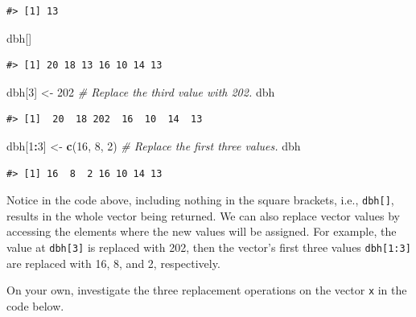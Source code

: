 \documentclass[
  11pt,
]{krantz}
\newenvironment{Shaded}{\begin{snugshade}}{\end{snugshade}}
\newcommand{\CommentTok}[1]{\textcolor[rgb]{0.56,0.35,0.01}{\textit{#1}}}
\newcommand{\DecValTok}[1]{\textcolor[rgb]{0.00,0.00,0.81}{#1}}
\newcommand{\KeywordTok}[1]{\textcolor[rgb]{0.13,0.29,0.53}{\textbf{#1}}}
\newcommand{\NormalTok}[1]{#1}
\newcommand{\OperatorTok}[1]{\textcolor[rgb]{0.81,0.36,0.00}{\textbf{#1}}}
\newcommand{\StringTok}[1]{\textcolor[rgb]{0.31,0.60,0.02}{#1}}
\theoremstyle{definition}
\theoremstyle{definition}
\theoremstyle{definition}
\theoremstyle{definition}
\theoremstyle{remark}
\begin{document}
\begin{verbatim}
#> [1] 13
\end{verbatim}

\begin{Shaded}
\begin{Highlighting}[]
\NormalTok{dbh[]}
\end{Highlighting}
\end{Shaded}

\begin{verbatim}
#> [1] 20 18 13 16 10 14 13
\end{verbatim}

\begin{Shaded}
\begin{Highlighting}[]
\NormalTok{dbh[}\DecValTok{3}\NormalTok{] \textless{}{-}}\StringTok{ }\DecValTok{202} \CommentTok{\# Replace the third value with 202.}
\NormalTok{dbh}
\end{Highlighting}
\end{Shaded}

\begin{verbatim}
#> [1]  20  18 202  16  10  14  13
\end{verbatim}

\begin{Shaded}
\begin{Highlighting}[]
\NormalTok{dbh[}\DecValTok{1}\OperatorTok{:}\DecValTok{3}\NormalTok{] \textless{}{-}}\StringTok{ }\KeywordTok{c}\NormalTok{(}\DecValTok{16}\NormalTok{, }\DecValTok{8}\NormalTok{, }\DecValTok{2}\NormalTok{) }\CommentTok{\# Replace the first three values.}
\NormalTok{dbh}
\end{Highlighting}
\end{Shaded}

\begin{verbatim}
#> [1] 16  8  2 16 10 14 13
\end{verbatim}

Notice in the code above, including nothing in the square brackets, i.e., \texttt{dbh{[}{]}}, results in the whole vector being returned. We can also replace vector values by accessing the elements where the new values will be assigned. For example, the value at \texttt{dbh{[}3{]}} is replaced with 202, then the vector's first three values \texttt{dbh{[}1:3{]}} are replaced with 16, 8, and 2, respectively.

On your own, investigate the three replacement operations on the vector \texttt{x} in the code below.
\end{document}
